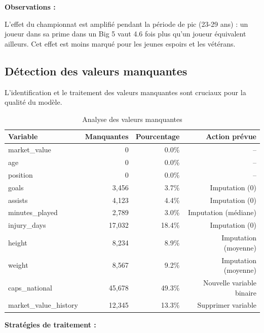 \documentclass[12pt,a4paper]{article}
\begin{document}
\textbf{Observations :}

L'effet du championnat est amplifié pendant la période de pic (23-29 ans) : un joueur dans sa prime dans un Big 5 vaut 4.6 fois plus qu'un joueur équivalent ailleurs. Cet effet est moins marqué pour les jeunes espoirs et les vétérans.

\newpage

\subsection{Détection des valeurs manquantes}

L'identification et le traitement des valeurs manquantes sont cruciaux pour la qualité du modèle.

\begin{table}[h]
\centering
\begin{tabular}{@{}lrrr@{}}
\toprule
\textbf{Variable} & \textbf{Manquantes} & \textbf{Pourcentage} & \textbf{Action prévue} \\ \midrule
market\_value & 0 & 0.0\% & -- \\
age & 0 & 0.0\% & -- \\
position & 0 & 0.0\% & -- \\
goals & 3,456 & 3.7\% & Imputation (0) \\
assists & 4,123 & 4.4\% & Imputation (0) \\
minutes\_played & 2,789 & 3.0\% & Imputation (médiane) \\
injury\_days & 17,032 & 18.4\% & Imputation (0) \\
height & 8,234 & 8.9\% & Imputation (moyenne) \\
weight & 8,567 & 9.2\% & Imputation (moyenne) \\
caps\_national & 45,678 & 49.3\% & Nouvelle variable binaire \\
market\_value\_history & 12,345 & 13.3\% & Supprimer variable \\ \bottomrule
\end{tabular}
\caption{Analyse des valeurs manquantes}
\end{table}

\textbf{Stratégies de traitement :}
\end{document}
